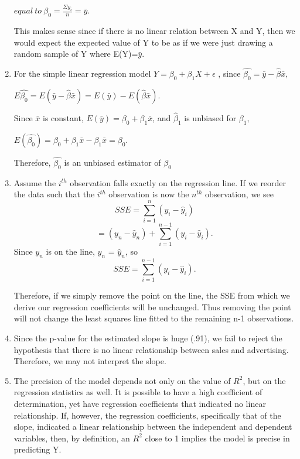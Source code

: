 \documentclass[]{article}
\begin{document}
\begin{enumerate}
\begin{center}
  $equal\ to\ \beta _0 = \frac{\Sigma y_i}{n}=\bar{y}$.
  
 \end{center}
 
 This makes sense since if there is no linear relation between X and Y, then we would expect the expected value of Y to be as if we were just drawing a random sample of Y where E(Y)=$\bar{y}.$

\item
For the simple linear regression model $Y=\beta _0 + \beta _1 X + \epsilon$ ,
since $\hat{\beta _0} = \bar{y}-\hat{\beta}\bar{x},$

\begin{center}
$E{\hat{\beta _0}}=E(\bar{y}-\hat{\beta}\bar{x})= E(\bar{y})-E(\hat{\beta}\bar{x}).$

Since $\bar{x}$ is constant, $E(\bar{y})=\beta _0 + \beta _1 \bar{x}$, and $\hat{\beta}_1$ is unbiased for $\beta _1,$ 

$E(\hat{\beta _0})=\beta _0 +\beta _1 \bar{x}-\beta _1 \bar{x} = \beta _0.$

\end{center}

Therefore, $\hat{\beta _0}$ is an unbiased estimator of $\beta _0$
\item

Assume the $i^{th}$ observation falls exactly on the regression line. If we reorder the data such that the $i^{th}$ observation is now the $n^{th}$ observation, we see $$SSE = \sum_{i=1}^{n}(y_i-\hat{y}_i)$$ $$=(y_n-\hat{y}_n)+\sum_{i=1}^{n-1}(y_i-\hat{y}_i).$$ Since $y_n$ is on the line, $y_n$ = $\hat{y}_n$, so $$SSE =\sum_{i=1}^{n-1}(y_i-\hat{y}_i).$$

Therefore, if we simply remove the point on the line, the SSE from which we derive our regression coefficients will be unchanged. Thus removing the point will not change the least squares line fitted to the remaining n-1 observations.

\item
Since the p-value for the estimated slope is huge (.91), we fail to reject the hypothesis that there is no linear relationship between sales and advertising. Therefore, we may not interpret the slope.

\item
The precision of the model depends not only on the value of $R^2$, but on the regression statistics as well. It is possible to have a high coefficient of determination, yet have regression coefficients that indicated no linear relationship. If, however, the regression coefficients, specifically that of the slope, indicated a linear relationship between the independent and dependent variables, then, by definition, an $R^2$ close to 1 implies the model is precise in predicting Y. 


\end{enumerate}
\end{document}
